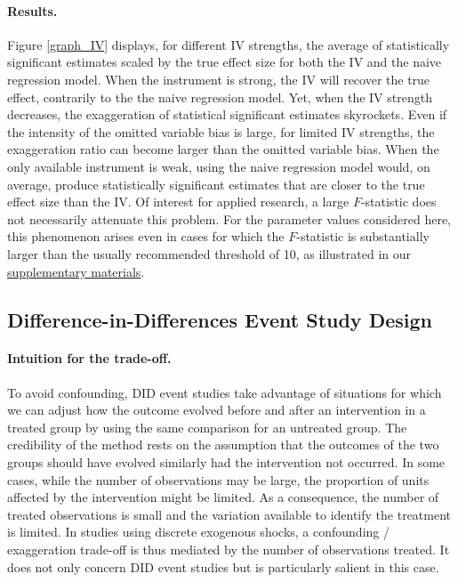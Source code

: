 \documentclass[12pt]{article}
\begin{document}
		\paragraph{Results.} Figure \ref{graph_IV} displays, for different IV strengths, the average of statistically significant estimates scaled by the true effect size for both the IV and the naive regression model. When the instrument is strong, the IV will recover the true effect, contrarily to the the naive regression model. Yet, when the IV strength decreases, the exaggeration of statistical significant estimates skyrockets. Even if the intensity of the omitted variable bias is large, for limited IV strengths, the exaggeration ratio can become larger than the omitted variable bias. When the only available instrument is weak, using the naive regression model would, on average, produce statistically significant estimates that are closer to the true effect size than the IV. Of interest for applied research, a large $F$-statistic does not necessarily attenuate this problem. For the parameter values considered here, this phenomenon arises even in cases for which the $F$-statistic is substantially larger than the usually recommended threshold of 10, as illustrated in our \href{https://vincentbagilet.github.io/causal_inflation/IV.html#f-statistic-analysis}{supplementary materials}. 
		
		
		\subsection{Difference-in-Differences Event Study Design}\label{sim_DID}
    
        			\paragraph{Intuition for the trade-off.} To avoid confounding, DID event studies take advantage of situations for which we can adjust how the outcome evolved before and after an intervention in a treated group by using the same comparison for an untreated group. The credibility of the method rests on the assumption that the outcomes of the two groups should have evolved similarly had the intervention not occurred. In some cases,  while the number of observations may be large, the proportion of units affected by the intervention might be limited. As a consequence, the number of treated observations is small and the variation available to identify the treatment is limited. In studies using discrete exogenous shocks, a confounding / exaggeration trade-off is thus mediated by the number of observations treated. It does not only concern DID event studies but is particularly salient in this case. 
        
\end{document}
